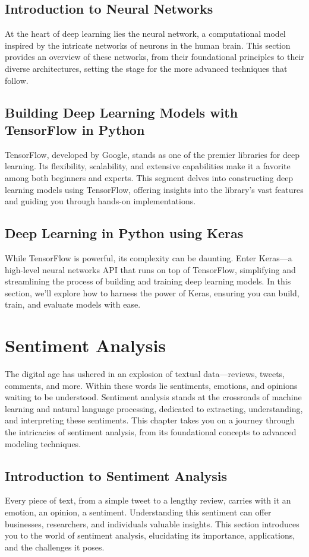 \documentclass{book}
\begin{document}
\section{Introduction to Neural Networks}
At the heart of deep learning lies the neural network, a computational model inspired by the intricate networks of neurons in the human brain. This section provides an overview of these networks, from their foundational principles to their diverse architectures, setting the stage for the more advanced techniques that follow.

\section{Building Deep Learning Models with TensorFlow in Python}
TensorFlow, developed by Google, stands as one of the premier libraries for deep learning. Its flexibility, scalability, and extensive capabilities make it a favorite among both beginners and experts. This segment delves into constructing deep learning models using TensorFlow, offering insights into the library's vast features and guiding you through hands-on implementations.

\section{Deep Learning in Python using Keras}
While TensorFlow is powerful, its complexity can be daunting. Enter Keras—a high-level neural networks API that runs on top of TensorFlow, simplifying and streamlining the process of building and training deep learning models. In this section, we'll explore how to harness the power of Keras, ensuring you can build, train, and evaluate models with ease.

\chapter{Sentiment Analysis}
The digital age has ushered in an explosion of textual data—reviews, tweets, comments, and more. Within these words lie sentiments, emotions, and opinions waiting to be understood. Sentiment analysis stands at the crossroads of machine learning and natural language processing, dedicated to extracting, understanding, and interpreting these sentiments. This chapter takes you on a journey through the intricacies of sentiment analysis, from its foundational concepts to advanced modeling techniques.

\section{Introduction to Sentiment Analysis}
Every piece of text, from a simple tweet to a lengthy review, carries with it an emotion, an opinion, a sentiment. Understanding this sentiment can offer businesses, researchers, and individuals valuable insights. This section introduces you to the world of sentiment analysis, elucidating its importance, applications, and the challenges it poses.
\end{document}
